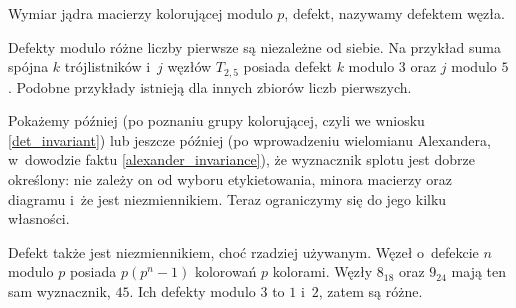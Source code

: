 \begin{definition}[defekt]
    Wymiar jądra macierzy kolorującej modulo $p$, defekt, nazywamy defektem węzła.
\end{definition}

Defekty modulo różne liczby pierwsze są niezależne od siebie.
Na przykład suma spójna $k$ trójlistników i~$j$ węzłów $T_{2,5}$ posiada defekt $k$ modulo $3$ oraz $j$ modulo $5$.
Podobne przykłady istnieją dla innych zbiorów liczb pierwszych.

Pokażemy później (po poznaniu grupy kolorującej, czyli we wniosku \ref{det_invariant}) lub jeszcze później (po wprowadzeniu wielomianu Alexandera, w~dowodzie faktu \ref{alexander_invariance}), że wyznacznik splotu jest dobrze określony: nie zależy on od wyboru etykietowania, minora macierzy oraz diagramu i~że jest niezmiennikiem.
Teraz ograniczymy się do jego kilku własności.

Defekt także jest niezmiennikiem, choć rzadziej używanym.
Węzeł o~defekcie $n$ modulo $p$ posiada $p(p^n-1)$ kolorowań $p$ kolorami.
Węzły $8_{18}$ oraz $9_{24}$ mają ten sam wyznacznik, $45$.
Ich defekty modulo $3$ to $1$ i~$2$, zatem są różne.




